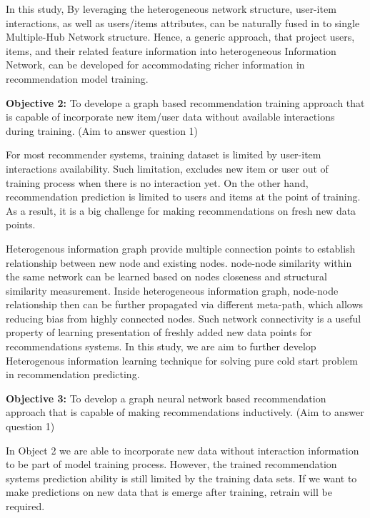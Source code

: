 In this study, By leveraging the heterogeneous network structure, user-item interactions, as well as users/items attributes, can be naturally fused in to single Multiple-Hub Network \citep{Shi2017} structure. Hence, a generic approach, that project users, items, and their related feature information into heterogeneous Information Network, can be developed for accommodating richer information in recommendation model training.


\bigskip
\textbf{Objective 2:} To develope a graph based recommendation training approach that is capable of incorporate new item/user data without available interactions during training. (Aim to answer question 1)

For most recommender systems, training dataset is limited by user-item interactions availability. Such limitation, excludes new item or user out of training process when there is no interaction yet. On the other hand, recommendation prediction is limited to users and items at the point of training. As a result, it is a big challenge for making recommendations on fresh new data points. 

Heterogenous information graph provide multiple connection points to establish relationship between new node and existing nodes. node-node similarity within the same network can be learned based on nodes closeness and structural similarity measurement. Inside heterogeneous information graph, node-node relationship then can be further propagated via different meta-path, which allows reducing bias from highly connected nodes. Such network connectivity is a useful property of learning presentation of freshly added new data points for recommendations systems. In this study, we are aim to further develop Heterogenous information learning technique for solving pure cold start problem in recommendation predicting.

\bigskip
\textbf{Objective 3:} To develop a graph neural network based recommendation approach that is capable of making recommendations inductively. (Aim to answer question 1)

In Object 2 we are able to incorporate new data without interaction information to be part of model training process. However, the trained recommendation systems prediction ability is still limited by the training data sets. If we want to make predictions on new data that is emerge after training, retrain will be required. 

